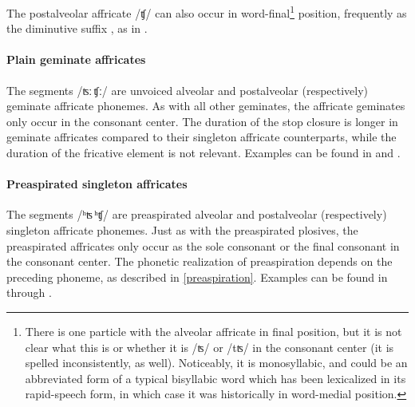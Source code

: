 The postalveolar affricate /ʧ/ can also occur in word-final\footnote{There is one particle  with the alveolar affricate in final position, but it is not clear what this is or whether it is /ʦ/ or /tʦ/ in the consonant center (it is spelled inconsistently, as well). Noticeably, it is monosyllabic, and could be an abbreviated form of a typical bisyllabic word which has been lexicalized in its rapid-speech form, in which case it was historically in word-medial position.} %
position, frequently as the diminutive suffix , as in .

\paragraph{Plain geminate affricates}
The segments /ʦː\,ʧː/ are unvoiced alveolar and postalveolar (respectively) geminate affricate phonemes. As with all other geminates, the affricate geminates only occur in the consonant center. The duration of the stop closure is longer in geminate affricates compared to their singleton affricate counterparts, while the duration of the fricative element is not relevant.
Examples can be found in  and .

\paragraph{Preaspirated singleton affricates}
The segments \mbox{/ʰʦ\,ʰʧ/} are preaspirated alveolar and postalveolar (respectively) singleton affricate phonemes. Just as with the preaspirated plosives, the preaspirated affricates only occur as the sole consonant or the final consonant in the consonant center. 
The phonetic realization of preaspiration depends on the preceding phoneme, as described in \SEC\ref{preaspiration}. 
Examples can be found in  through .


